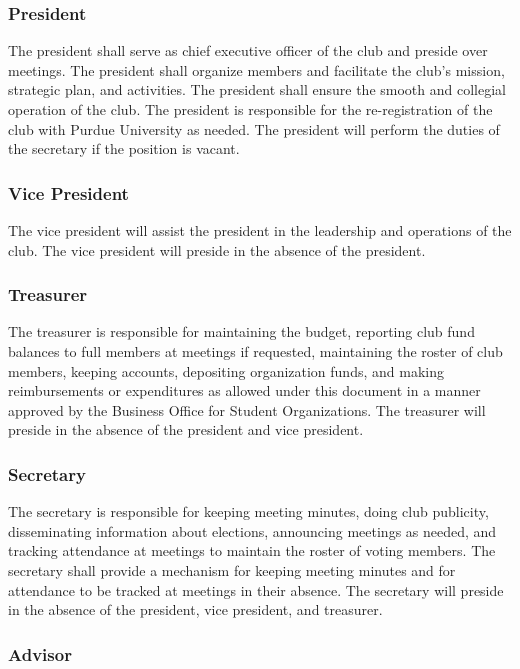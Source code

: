 \documentclass{article}
\begin{document}
\subsubsection{President}

The president shall serve as chief executive officer of the club and preside
over meetings. The president shall organize members and facilitate the club's
mission, strategic plan, and activities. The president shall ensure the smooth
and collegial operation of the club. The president is responsible for the
re-registration of the club with Purdue University as needed. The president will
perform the duties of the secretary if the position is vacant.

\subsubsection{Vice President}

The vice president will assist the president in the leadership and operations of
the club. The vice president will preside in the absence of the president.

\subsubsection{Treasurer}

The treasurer is responsible for maintaining the budget, reporting club fund
balances to full members at meetings if requested, maintaining the roster of
club members, keeping accounts, depositing organization funds, and making
reimbursements or expenditures as allowed under this document in a manner
approved by the Business Office for Student Organizations. The treasurer will
preside in the absence of the president and vice president.

\subsubsection{Secretary}

The secretary is responsible for keeping meeting minutes, doing club publicity,
disseminating information about elections, announcing meetings as needed, and
tracking attendance at meetings to maintain the roster of voting members. The
secretary shall provide a mechanism for keeping meeting minutes and for
attendance to be tracked at meetings in their absence. The secretary will
preside in the absence of the president, vice president, and treasurer.

\subsubsection{Advisor}
\end{document}
